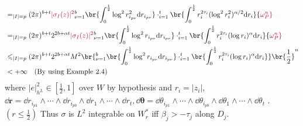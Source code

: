 \documentclass[lang=en,12pt]{beautybook}
\begin{document}
\begin{solution}
\begin{enumerate}
{\begin{align*}
                 & =\sum_{|I|=p}(2\pi)^{b+t}{\color{purple}|\sigma_I(z)|^2} \prod_{\nu=1}^b\br{ \int_{0}^{\frac 12} \log^2 r_{i_{p\nu}}^2 \dd r_{i_{p\nu}} }\cdot \prod_{i=1}^t\br{ \int_{0}^{\frac 12} r_i^{2\tau_i}(\log^2 r_i^2)^{\alpha/2} \dd r_i } {\color{purple}\omega_P^n}                                               \\
                 & =\sum_{|I|=p}(2\pi)^{b+t} 2^{2b+\alpha t}{\color{purple}|\sigma_I(z)|^2} \prod_{\nu=1}^b\br{ \int_{0}^{\frac 12} \log^2 r_{i_{p\nu}} \dd r_{i_{p\nu}} }\cdot \prod_{i=1}^t\br{ \int_{0}^{\frac 12} r_i^{2\tau_i}(\log r_i)^{\alpha} \dd r_i } {\color{purple}\omega_P^n}                                       \\
                 & \leqslant \sum_{|I|=p}(2\pi)^{b+t} 2^{2b+\alpha t} M^2  \br{\prod_{\nu=1}^b\br{ \int_{0}^{\frac 12} \log^2 r_{i_{p\nu}} \dd r_{i_{p\nu}} }\cdot \prod_{i=1}^t\br{ \int_{0}^{\frac 12} r_i^{2\tau_i}(\log r_i)^{\alpha} \dd r_i } } \br{\frac 12}^n                                                             \\
                 & <+\infty \text{\quad (By using Example 2.4)}
              \end{align*}}
          where $|e|^2_{h^L}\in [\frac 12,1]$ over $W$ by hypothesis and $r_i=|z_i|$, $\dd\bm{r}=\dd r_{i_{p1}}\wedge \cdots \wedge\dd r_{i_{pb}}\wedge \dd r_{1}\wedge \cdots \wedge \dd r_{t}, \dd\bm{\theta}=\dd \theta_{i_{p1}}\wedge \cdots \wedge\dd \theta_{i_{pb}}\wedge \dd \theta_{1}\wedge \cdots \wedge \dd \theta_{t}$ . $(r\leq \frac 12)$ Thus $\sigma$ is $L^2$ integrable on $W_r^*$ iff $\beta_j>-\tau_j$ along $D_j$.


\end{enumerate}
\end{solution}
\end{document}
